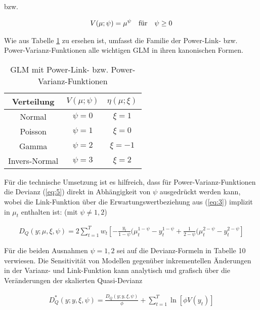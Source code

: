 bzw.

\begin{eqnarray}\label{eq:8b}
V(\mu;\psi)=\mu^\psi  \quad \textnormal{für} \quad \psi \geq 0
\end{eqnarray}


Wie aus Tabelle \ref{tab:Power_link} zu ersehen ist, umfasst die Familie der Power-Link- bzw. Power-Varianz-Funktionen alle wichtigen GLM in ihren kanonischen Formen.

\begin{table}
 \caption{GLM mit Power-Link- bzw. Power-Varianz-Funktionen}
\begin{center}
\begin{tabular}{c|c|c}
Verteilung         &  $V(\mu;\psi)$  & $\eta(\mu;\xi)$    \\ \hline
Normal		  &  $ \psi= 0 $   &  $\xi=1$            \\
Poisson		  &  $ \psi= 1 $   &  $\xi=0$            \\
Gamma		  &  $ \psi= 2 $   &  $\xi=-1$            \\
Invers-Normal	  &  $ \psi= 3 $   &  $\xi=2$            \\
\end{tabular}
\end{center}
\label{tab:Power_link}
 \end{table} 

Für die technische Umsetzung ist es hilfreich, dass für Power-Varianz-Funktionen die Devianz (\ref{eq:5}) direkt in Abhängigkeit von $\psi$  ausgedrückt werden kann, wobei die Link-Funktion über die Erwartungswertbeziehung aus (\ref{eq:3}) implizit in $\mu_t$  enthalten ist: (mit $\psi \neq 1,2$)

\begin{eqnarray}  \label{eq:9}
D_Q(y;\mu,\xi,\psi)=2 \sum_{t=1}^T w_t \left[ - \frac{y_t}{1-\psi} ( \mu_t^{1-\psi} - y_t^{1-\psi} +  \frac{1}{2-\psi} ( \mu_t^{2-\psi} - y_t^{2-\psi}    \right] 
\end{eqnarray}

Für die beiden Ausnahmen $\psi = 1,2$  sei auf die Devianz-Formeln in Tabelle 10 verwiesen. Die Sensitivität von Modellen gegenüber inkrementellen Änderungen in der Varianz- und Link-Funktion kann analytisch und grafisch über die Veränderungen der skalierten Quasi-Devianz

\begin{eqnarray}  
D^*_Q(y; y,\xi,\psi)= \frac{D_Q(y; y,\xi,\psi)}{\phi} + \sum_{t=1}^T \ln[\phi V(y_t)]
\end{eqnarray}
 
